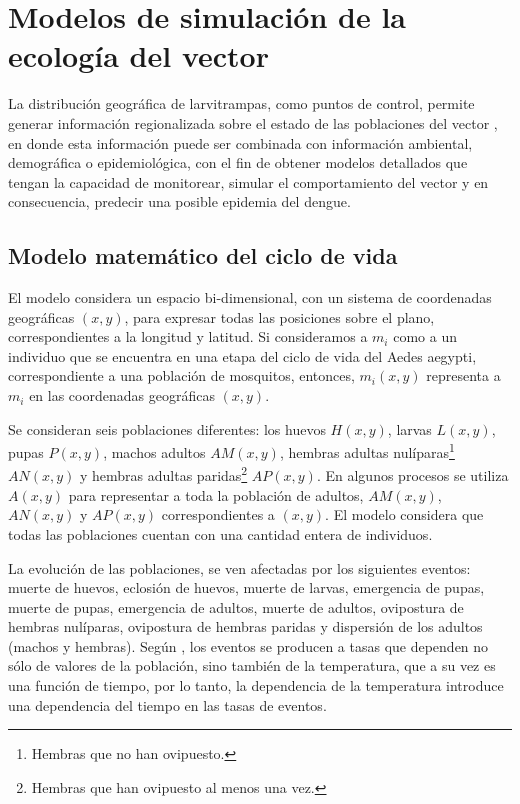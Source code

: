 \section{Modelos de simulación de la ecología del vector}
La distribución geográfica de larvitrampas, como puntos de control, permite generar información
regionalizada sobre el estado de las poblaciones del vector \cite{NINO2011}, en donde esta
información puede ser combinada con información ambiental, demográfica o epidemiológica, con el
fin de obtener modelos detallados que tengan la capacidad de monitorear, simular el comportamiento
del vector y en consecuencia, predecir una posible epidemia del dengue.

\subsection{Modelo matemático del ciclo de vida}
El modelo considera un espacio bi-dimensional, con un sistema de coordenadas geográficas $(x,y)$,
para expresar todas las posiciones sobre el plano, correspondientes a la longitud y latitud. Si
consideramos a $m_{i}$ como a un individuo que se encuentra en una etapa del ciclo de vida del
Aedes aegypti, correspondiente a una población de mosquitos, entonces, $m_{i}(x,y)$ representa a
$m_{i}$ en las coordenadas geográficas $(x,y)$.

Se consideran seis poblaciones diferentes: los huevos $H(x,y)$, larvas $L(x,y)$, pupas $P(x,y)$,
machos adultos $AM(x,y)$, hembras adultas nulíparas\footnote{Hembras que no han ovipuesto.}
$AN(x,y)$ y hembras adultas paridas\footnote{Hembras que han ovipuesto al menos una vez.} $AP(x,y)$. En algunos procesos se utiliza $A(x, y)$ para representar a toda la población de adultos,
$AM(x,y)$, $AN(x,y)$ y $AP(x,y)$ correspondientes a $(x, y)$. El modelo considera que todas las
poblaciones cuentan con una cantidad entera de individuos.

La evolución de las poblaciones, se ven afectadas por los siguientes eventos: muerte de huevos,
eclosión de huevos, muerte de larvas, emergencia de pupas, muerte de pupas, emergencia de adultos,
muerte de adultos, ovipostura de hembras nulíparas, ovipostura de hembras paridas y dispersión
de los adultos (machos y hembras). Según \cite{otero2006stochastic}, los eventos se producen a
tasas que dependen no sólo de valores de la población, sino también de la temperatura, que a su
vez es una función de tiempo, por lo tanto, la dependencia de la temperatura introduce una
dependencia del tiempo en las tasas de eventos.










